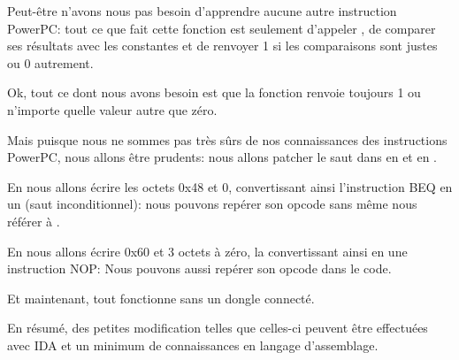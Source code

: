 Peut-être n'avons nous pas besoin d'apprendre aucune autre instruction PowerPC: tout
ce que fait cette fonction est seulement d'appeler , de comparer ses
résultats avec les constantes et de renvoyer 1 si les comparaisons sont justes ou
0 autrement.

Ok, tout ce dont nous avons besoin est que la fonction  renvoie toujours
1 ou n'importe quelle valeur autre que zéro.

Mais puisque nous ne sommes pas très sûrs de nos connaissances des instructions PowerPC,
nous allons être prudents: nous allons patcher le saut dans  en 
et en .

En  nous allons écrire les octets 0x48 et 0, convertissant ainsi l'instruction
\ac{BEQ} en un  (saut inconditionnel): nous pouvons repérer son opcode sans
même nous référer à \PPC.

En  nous allons écrire  0x60 et 3 octets à zéro, la convertissant
ainsi en une instruction \ac{NOP}:
Nous pouvons aussi repérer son opcode dans le code.

Et maintenant, tout fonctionne sans un dongle connecté.

En résumé, des petites modification telles que celles-ci peuvent être effectuées
avec \ac{IDA} et un minimum de connaissances en langage d'assemblage.
